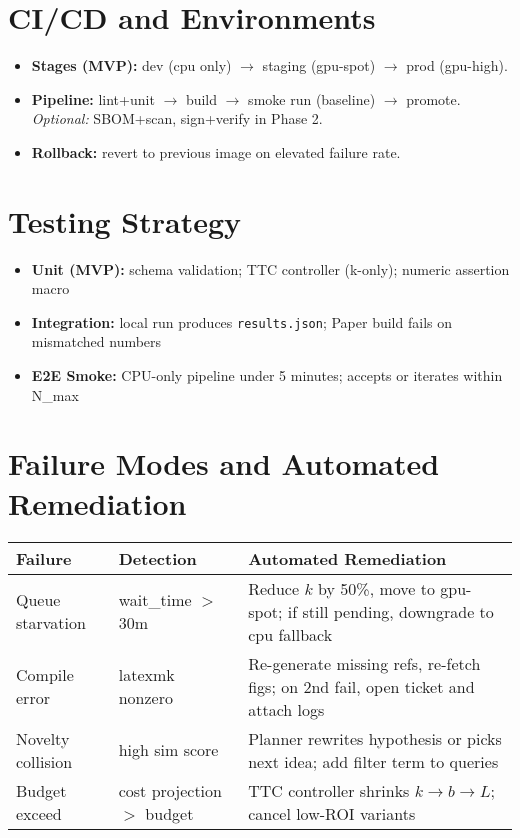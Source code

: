 \section{CI/CD and Environments}
\begin{itemize}[leftmargin=1.4em]
\item \textbf{Stages (MVP):} dev (cpu only) $\rightarrow$ staging (gpu-spot) $\rightarrow$ prod (gpu-high).
\item \textbf{Pipeline:} lint+unit $\rightarrow$ build $\rightarrow$ smoke run (baseline) $\rightarrow$ promote. \textit{Optional:} SBOM+scan, sign+verify in Phase 2.
\item \textbf{Rollback:} revert to previous image on elevated failure rate.
\end{itemize}

\section{Testing Strategy}
\begin{itemize}[leftmargin=1.4em]
  \item \textbf{Unit (MVP):} schema validation; TTC controller (k-only); numeric assertion macro
  \item \textbf{Integration:} local run produces \texttt{results.json}; Paper build fails on mismatched numbers
  \item \textbf{E2E Smoke:} CPU-only pipeline under 5 minutes; accepts or iterates within N\_max
\end{itemize}

\section{Failure Modes and Automated Remediation}
\begin{tabular}{@{}p{3.7cm}p{6.8cm}p{4.6cm}@{}}
\toprule
Failure & Detection & Automated Remediation \\\midrule
Queue starvation & wait\_time $>$ 30m & Reduce $k$ by 50\%, move to gpu-spot; if still pending, downgrade to cpu fallback \\
Compile error & latexmk nonzero & Re-generate missing refs, re-fetch figs; on 2nd fail, open ticket and attach logs \\
Novelty collision & high sim score & Planner rewrites hypothesis or picks next idea; add filter term to queries \\
Budget exceed & cost projection $>$ budget & TTC controller shrinks $k\rightarrow b\rightarrow L$; cancel low-ROI variants \\
\bottomrule
\end{tabular}

